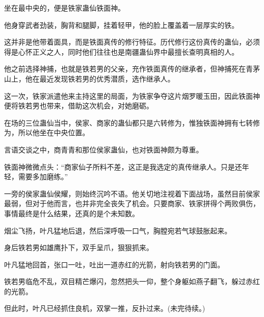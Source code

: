 \begin{this_body}
坐在最中央的，便是铁家蛊仙铁面神。

他身穿武者劲装，胸背和腿脚，挂着轻甲，他的脸上覆盖着一层厚实的铁。

这并非是他带着面具，而是铁面真传的修行特征。历代修行这份真传的蛊仙，必须得是心怀正义之人，同时他们往往也是南疆蛊仙界中最擅长查明真相的人。

他之前选择神捕，也就是铁若男的父亲，充作铁面真传的继承者，但神捕死在青茅山上，他在最近发现铁若男的优秀潜质，选作继承人。

这一次，铁家派遣他来主持这里的局面，为铁家争夺这片烟罗暖玉田，因此铁面神便将铁若男也带来，借助这次机会，对她磨砺。

在场的三位蛊仙当中，侯家、商家的蛊仙都只是六转修为，惟独铁面神拥有七转修为，所以他坐在中央位置。

言语交谈之中，商青青和那位侯家蛊仙，也对铁面神颇为尊重。

铁面神微微点头：“商家仙子所料不差，这正是我选定的真传继承人。只是还年轻，需要多加磨练。”

一旁的侯家蛊仙侯耀，则始终沉吟不语。他关切地注视着下面战场，虽然目前侯家最弱，但对于他而言，也并非完全丧失了机会。只要商家、铁家拼得个两败俱伤，事情最终是什么结果，还真的是个未知数。

烟尘飞扬，叶凡猛地后退，然后深呼吸一口气，胸膛宛若气球鼓胀起来。

身后铁若男如雄鹰扑下，双手呈爪，狠狠抓来。

叶凡猛地回首，张口一吐，吐出一道赤红的光箭，射向铁若男的门面。

铁若男临危不乱，双目精芒爆闪，忽然把头一仰，整个身躯如燕子翻飞，躲过赤红的光箭。

但此时，叶凡已经抓住良机，双掌一推，反扑过来。(未完待续。)

\end{this_body}

